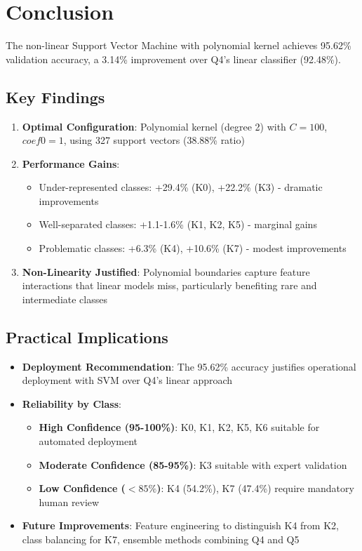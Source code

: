 \documentclass[12pt]{article}
\begin{document}
\section{Conclusion}

The non-linear Support Vector Machine with polynomial kernel achieves 95.62\% validation accuracy, a 3.14\% improvement over Q4's linear classifier (92.48\%).

\subsection{Key Findings}

\begin{enumerate}
    \item \textbf{Optimal Configuration}: Polynomial kernel (degree 2) with $C = 100$, $coef0 = 1$, using 327 support vectors (38.88\% ratio)
    
    \item \textbf{Performance Gains}:
    \begin{itemize}
        \item Under-represented classes: +29.4\% (K0), +22.2\% (K3) - dramatic improvements
        \item Well-separated classes: +1.1-1.6\% (K1, K2, K5) - marginal gains
        \item Problematic classes: +6.3\% (K4), +10.6\% (K7) - modest improvements
    \end{itemize}
    
    \item \textbf{Non-Linearity Justified}: Polynomial boundaries capture feature interactions that linear models miss, particularly benefiting rare and intermediate classes
\end{enumerate}

\subsection{Practical Implications}

\begin{itemize}
    \item \textbf{Deployment Recommendation}: The 95.62\% accuracy justifies operational deployment with SVM over Q4's linear approach
    
    \item \textbf{Reliability by Class}:
    \begin{itemize}
        \item \textbf{High Confidence (95-100\%)}: K0, K1, K2, K5, K6 suitable for automated deployment
        \item \textbf{Moderate Confidence (85-95\%)}: K3 suitable with expert validation
        \item \textbf{Low Confidence ($< 85\%$)}: K4 (54.2\%), K7 (47.4\%) require mandatory human review
    \end{itemize}
    
    \item \textbf{Future Improvements}: Feature engineering to distinguish K4 from K2, class balancing for K7, ensemble methods combining Q4 and Q5
\end{itemize}
\end{document}

